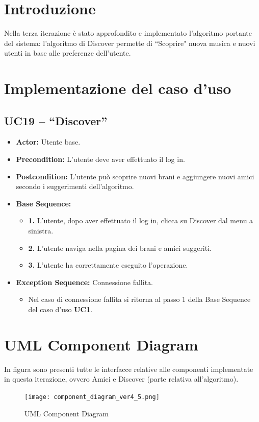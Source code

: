 \section{Introduzione}
Nella terza iterazione è stato approfondito e implementato l'algoritmo portante del sistema: l'algoritmo di Discover permette di ``Scoprire" nuova 
musica e nuovi utenti in base alle preferenze dell'utente.

\section{Implementazione del caso d'uso}
\subsection{UC19 -- ``Discover''}
\begin{itemize}
    \item \textbf{Actor:} Utente base.
    \item \textbf{Precondition:} L'utente deve aver effettuato il log in.
    \item \textbf{Postcondition:} L'utente può scoprire nuovi brani e aggiungere nuovi amici secondo i suggerimenti dell'algoritmo. 
    \item \textbf{Base Sequence:}
    \begin{itemize}
        \item \textbf{1.} L'utente, dopo aver effettuato il log in, clicca su Discover dal menu a sinistra.
        \item \textbf{2.} L'utente naviga nella pagina dei brani e amici suggeriti.
        \item \textbf{3.} L'utente ha correttamente eseguito l'operazione.
    \end{itemize}
    \item \textbf{Exception Sequence:} Connessione fallita.
    \begin{itemize}
        \item Nel caso di connessione fallita si ritorna al passo 1 della Base Sequence del caso d'uso \textbf{UC1}.
    \end{itemize}
\end{itemize}
\vspace{1cm}

\section{UML Component Diagram}
In figura sono presenti tutte le interfacce
relative alle componenti implementate in questa iterazione, 
ovvero Amici e Discover (parte relativa all'algoritmo).
\begin{figure}[H]
    \centering
    \texttt{[image: component\_diagram\_ver4\_5.png]} 
    \caption{UML Component Diagram}
    \label{fig-uml-component-diag_5}
\end{figure}

